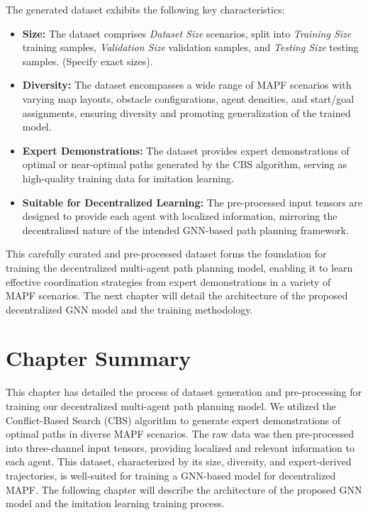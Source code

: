 The generated dataset exhibits the following key characteristics:

\begin{itemize}
    \item \textbf{Size:} The dataset comprises \textit{Dataset Size} scenarios, split into \textit{Training Size} training samples, \textit{Validation Size} validation samples, and \textit{Testing Size} testing samples. (Specify exact sizes).
    \item \textbf{Diversity:} The dataset encompasses a wide range of MAPF scenarios with varying map layouts, obstacle configurations, agent densities, and start/goal assignments, ensuring diversity and promoting generalization of the trained model.
    \item \textbf{Expert Demonstrations:} The dataset provides expert demonstrations of optimal or near-optimal paths generated by the CBS algorithm, serving as high-quality training data for imitation learning.
    \item \textbf{Suitable for Decentralized Learning:} The pre-processed input tensors are designed to provide each agent with localized information, mirroring the decentralized nature of the intended GNN-based path planning framework.
\end{itemize}

This carefully curated and pre-processed dataset forms the foundation for training the decentralized multi-agent path planning model, enabling it to learn effective coordination strategies from expert demonstrations in a variety of MAPF scenarios. The next chapter will detail the architecture of the proposed decentralized GNN model and the training methodology.





\section{Chapter Summary}

This chapter has detailed the process of dataset generation and pre-processing for training our decentralized multi-agent path planning model. We utilized the Conflict-Based Search (CBS) algorithm to generate expert demonstrations of optimal paths in diverse MAPF scenarios. The raw data was then pre-processed into three-channel input tensors, providing localized and relevant information to each agent. This dataset, characterized by its size, diversity, and expert-derived trajectories, is well-suited for training a GNN-based model for decentralized MAPF. The following chapter will describe the architecture of the proposed GNN model and the imitation learning training process.